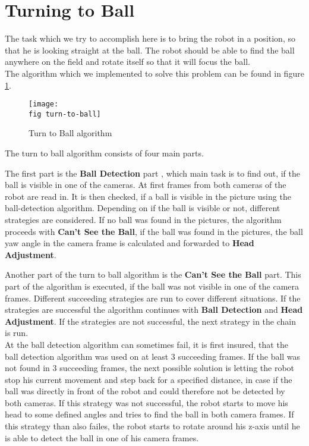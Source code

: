 \section{Turning to Ball}
\label{j sec turning to ball}
The task which we try to accomplish here is to bring the robot in a position, so that he is looking straight at the ball.
The robot should be able to find the ball anywhere on the field and rotate itself so that it will focus the ball. \\
The algorithm which we implemented to solve this problem can be found in figure \ref{j figure turn to ball}.

\begin{figure}[ht]
	\texttt{[image: \\fig turn-to-ball]}
	\caption{Turn to Ball algorithm}
	\label{j figure turn to ball}
\end{figure}

The turn to ball algorithm consists of four main parts. 


The first part is the \textbf{Ball Detection} part \label{j sec ball detection}, which main task is to find out, if the ball is visible in one of the cameras. At first frames from both cameras of the robot are read in. It is then checked, if a ball is visible in the picture using the ball-detection algorithm. Depending on if the ball is visible or not, different strategies are considered. If no ball was found in the pictures, the algorithm proceeds with \textbf{Can't See the Ball}, if the ball was found in the pictures, the ball yaw angle in the camera frame is calculated and forwarded to \textbf{Head Adjustment}.

Another part of the turn to ball algorithm is the \textbf{Can't See the Ball} part.
This part of the algorithm is executed, if the ball was not visible in one of the camera frames. Different succeeding strategies are run to cover different situations. If the strategies are successful the algorithm continues with \textbf{Ball Detection} and \textbf{Head Adjustment}. If the strategies are not successful, the next strategy in the chain is run. \\
At the ball detection algorithm can sometimes fail, it is first insured, that 
the ball detection algorithm was used on at least 3 succeeding frames. If the ball was not found in 3 succeeding frames, the next possible solution is letting the robot stop his current movement and step back for a specified distance, in case if the ball was directly in front of the robot and could therefore not be detected by both cameras. If this strategy was not successful, the robot starts to move his head to some defined angles and tries to find the ball in both camera frames. If this strategy than also failes, the robot starts to rotate around his z-axis until he is able to detect the ball in one of his camera frames.


